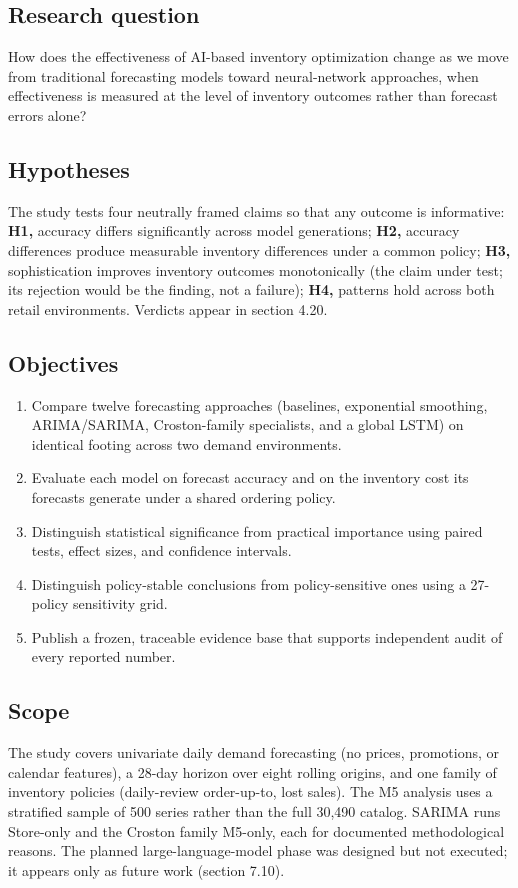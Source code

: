 \subsection{Research question}
\label{sec:rq}
How does the effectiveness of AI-based inventory optimization change as we move
from traditional forecasting models toward neural-network approaches, when
effectiveness is measured at the level of inventory outcomes rather than
forecast errors alone?

\subsection{Hypotheses}
\label{sec:hypotheses}
The study tests four neutrally framed claims so that any outcome is
informative: \textbf{H1,} accuracy differs significantly across model
generations; \textbf{H2,} accuracy differences produce measurable inventory
differences under a common policy; \textbf{H3,} sophistication improves
inventory outcomes monotonically (the claim under test; its rejection would be
the finding, not a failure); \textbf{H4,} patterns hold across both retail
environments. Verdicts appear in section 4.20.

\subsection{Objectives}
\label{sec:objectives}
\begin{enumerate}
\item Compare twelve forecasting approaches (baselines, exponential
smoothing, ARIMA/SARIMA, Croston-family specialists, and a global LSTM) on
identical footing across two demand environments.
\item Evaluate each model on forecast accuracy and on the inventory cost its
forecasts generate under a shared ordering policy.
\item Distinguish statistical significance from practical importance using
paired tests, effect sizes, and confidence intervals.
\item Distinguish policy-stable conclusions from policy-sensitive ones using a
27-policy sensitivity grid.
\item Publish a frozen, traceable evidence base that supports independent
audit of every reported number.
\end{enumerate}

\subsection{Scope}
\label{sec:scope}
The study covers univariate daily demand forecasting (no prices, promotions, or
calendar features), a 28-day horizon over eight rolling origins, and one
family of inventory policies (daily-review order-up-to, lost sales). The M5
analysis uses a stratified sample of 500 series rather than the full 30,490
catalog. SARIMA runs Store-only and the Croston family M5-only, each for
documented methodological reasons. The planned large-language-model phase was
designed but not executed; it appears only as future work (section 7.10).

